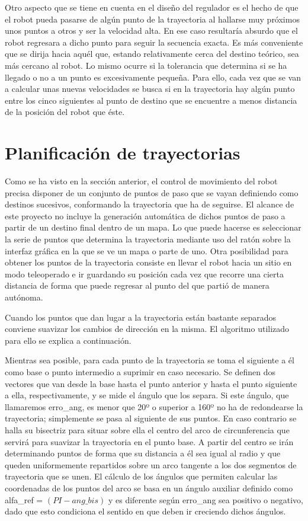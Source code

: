 \clearpage
Otro aspecto que se tiene en cuenta en el diseño del regulador es el hecho de que el robot pueda pasarse de algún punto de la trayectoria al hallarse muy próximos unos puntos a otros y ser la velocidad alta. En ese caso resultaría absurdo que el robot regresara a dicho punto para seguir la secuencia exacta. Es más conveniente que se dirija hacia aquél que, estando relativamente cerca del destino teórico, sea más cercano al robot. Lo mismo ocurre si la tolerancia que determina si se ha llegado o no a un punto es excesivamente pequeña. Para ello, cada vez que se van a calcular unas nuevas velocidades se busca si en la trayectoria hay algún punto entre los cinco siguientes al punto de destino que se encuentre a menos distancia de la posición del robot que éste.

\section{Planificación de trayectorias}\label{tray}
Como se ha visto en la sección anterior, el control de movimiento del robot precisa disponer de un conjunto de puntos de paso que se vayan definiendo como destinos sucesivos, conformando la trayectoria que ha de seguirse. El alcance de este proyecto no incluye la generación automática de dichos puntos de paso a partir de un destino final dentro de un mapa. Lo que puede hacerse es seleccionar la serie de puntos que determina la trayectoria mediante uso del ratón sobre la interfaz gráfica en la que se ve un mapa o parte de uno. Otra posibilidad para obtener los puntos de la trayectoria consiste en llevar el robot hacia un sitio en modo teleoperado e ir guardando su posición cada vez que recorre una cierta distancia de forma que puede regresar al punto del que partió de manera autónoma.

Cuando los puntos que dan lugar a la trayectoria están bastante separados conviene suavizar los cambios de dirección en la misma. El algoritmo utilizado para ello se explica a continuación.

Mientras sea posible, para cada punto de la trayectoria se toma el siguiente a él como base o punto intermedio a suprimir en caso necesario. Se definen dos vectores que van desde la base hasta el punto anterior y hasta el punto siguiente a ella, respectivamente, y se mide el ángulo que los separa. Si este ángulo, que llamaremos erro\_ang, es menor que 20º o superior a 160º no ha de redondearse la trayectoria; simplemente se pasa al siguiente de sus puntos. En caso contrario se halla su bisectriz para situar sobre ella el centro del arco de circunferencia que servirá para suavizar la trayectoria en el punto base. A partir del centro se irán determinando puntos de forma que su distancia a él sea igual al radio y que queden uniformemente repartidos sobre un arco tangente a los dos segmentos de trayectoria que se unen. El cálculo de los ángulos que permiten calcular las coordenadas de los puntos del arco se basa en un ángulo auxiliar definido como alfa\_ref = $(PI - ang\_bis)$ y es diferente según erro\_ang sea positivo o negativo, dado que esto condiciona el sentido en que deben ir creciendo dichos ángulos.

